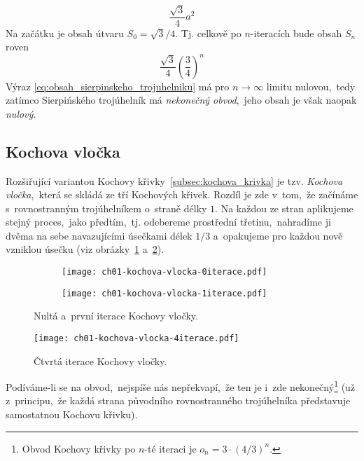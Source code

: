 \begin{equation*}
    \dfrac{\sqrt{3}}{4}a^2
\end{equation*}
Na začátku je obsah útvaru $S_0=\sqrt{3}/4$. Tj. celkově po $n$-iteracích bude obsah $S_n$ roven
\begin{equation}\label{eq:obsah_sierpinskeho_trojuhelniku}
    \dfrac{\sqrt{3}}{4}\left(\dfrac{3}{4}\right)^n
\end{equation}
Výraz \eqref{eq:obsah_sierpinskeho_trojuhelniku} má pro $n\to\infty$ limitu nulovou,~tedy zatímco Sierpińského trojúhelník má \emph{nekonečný obvod},~jeho obsah je však naopak \emph{nulový}.

\subsection{Kochova vločka}\label{subsec:kochova_vlocka}
Rozšiřující variantou Kochovy křivky~\ref{subsec:kochova_krivka} je tzv. \emph{Kochova vločka},~která se skládá ze tří Kochových křivek. Rozdíl je zde v~tom,~že začínáme s~rovnostranným trojúhelníkem o~straně délky $1$. Na každou ze stran aplikujeme stejný proces,~jako předtím,~tj. odebereme prostřední třetinu,~nahradíme ji dvěma na sebe navazujícími úsečkami délek $1/3$ a~opakujeme pro každou nově vzniklou úsečku (viz obrázky~\ref{fig:kochova_vlocka_dve_iterace} a~\ref{fig:kochova_krivka_5iterace}).
\begin{figure}[h]
    \centering
    \begin{subfigure}{\subfigwidth}
        \centering
        \texttt{[image: ch01-kochova-vlocka-0iterace.pdf]}
    \end{subfigure}
    \qquad
    \begin{subfigure}{\subfigwidth}
        \centering
        \texttt{[image: ch01-kochova-vlocka-1iterace.pdf]}
    \end{subfigure}
    \caption{Nultá a~první iterace Kochovy vločky.}
    \label{fig:kochova_vlocka_dve_iterace}
\end{figure}
\begin{figure}[h]
    \centering
    \texttt{[image: ch01-kochova-vlocka-4iterace.pdf]}
    \caption{Čtvrtá iterace Kochovy vločky.}
    \label{fig:kochova_krivka_5iterace}
\end{figure}
Podíváme-li se na obvod,~nejspíše nás nepřekvapí,~že ten je i~zde nekonečný\footnote{Obvod Kochovy křivky po $n$-té iteraci je $o_n=3\cdot(4/3)^{n}$.} (už z~principu,~že každá strana původního rovnostranného trojúhelníka představuje samostatnou Kochovu křivku).
